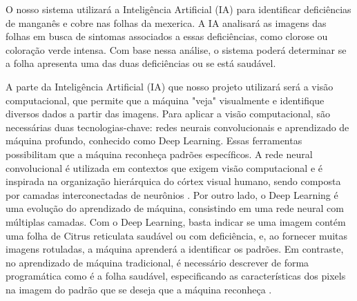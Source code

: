 O nosso sistema utilizará a Inteligência Artificial (IA) para identificar deficiências de manganês e cobre nas folhas da mexerica. A IA analisará as imagens das folhas em busca de sintomas associados a essas deficiências, como clorose ou coloração verde intensa. Com base nessa análise, o sistema poderá determinar se a folha apresenta uma das duas deficiências ou se está saudável.

A parte da Inteligência Artificial (IA) que nosso projeto utilizará será a visão computacional, que permite que a máquina "veja" visualmente e identifique diversos dados a partir das imagens. Para aplicar a visão computacional, são necessárias duas tecnologias-chave: redes neurais convolucionais e aprendizado de máquina profundo, conhecido como Deep Learning. Essas ferramentas possibilitam que a máquina reconheça padrões específicos. A rede neural convolucional é utilizada em contextos que exigem visão computacional e é inspirada na organização hierárquica do córtex visual humano, sendo composta por camadas interconectadas de neurônios \cite{IntroduçãoRedeNeural}. Por outro lado, o Deep Learning é uma evolução do aprendizado de máquina, consistindo em uma rede neural com múltiplas camadas. Com o Deep Learning, basta indicar se uma imagem contém uma folha de Citrus reticulata saudável ou com deficiência, e, ao fornecer muitas imagens rotuladas, a máquina aprenderá a identificar os padrões. Em contraste, no aprendizado de máquina tradicional, é necessário descrever de forma programática como é a folha saudável, especificando as características dos pixels na imagem do padrão que se deseja que a máquina reconheça \cite{IntroduçãoDeepLearning}.